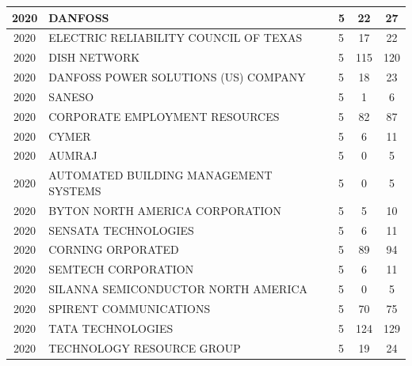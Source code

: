 \documentclass{article}%
\begin{document}
\begin{longtable}{c|p{20em}|p{5em}|c|c}
\hline%
2020&DANFOSS&5&22&27\\%
\hline%
2020&ELECTRIC RELIABILITY COUNCIL OF TEXAS&5&17&22\\%
\hline%
2020&DISH NETWORK&5&115&120\\%
\hline%
2020&DANFOSS POWER SOLUTIONS (US) COMPANY&5&18&23\\%
\hline%
2020&SANESO&5&1&6\\%
\hline%
2020&CORPORATE EMPLOYMENT RESOURCES&5&82&87\\%
\hline%
2020&CYMER&5&6&11\\%
\hline%
2020&AUMRAJ&5&0&5\\%
\hline%
2020&AUTOMATED BUILDING MANAGEMENT SYSTEMS&5&0&5\\%
\hline%
2020&BYTON NORTH AMERICA CORPORATION&5&5&10\\%
\hline%
2020&SENSATA TECHNOLOGIES&5&6&11\\%
\hline%
2020&CORNING ORPORATED&5&89&94\\%
\hline%
2020&SEMTECH CORPORATION&5&6&11\\%
\hline%
2020&SILANNA SEMICONDUCTOR NORTH AMERICA&5&0&5\\%
\hline%
2020&SPIRENT COMMUNICATIONS&5&70&75\\%
\hline%
2020&TATA TECHNOLOGIES&5&124&129\\%
\hline%
2020&TECHNOLOGY RESOURCE GROUP&5&19&24\\%
\hline%
\end{longtable}

%
\newpage%
\end{document}
